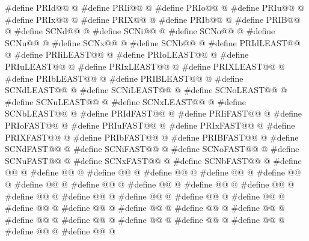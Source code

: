 \begin{codeblock}
#define PRId@@ @\seebelow@
#define PRIi@@ @\seebelow@
#define PRIo@@ @\seebelow@
#define PRIu@@ @\seebelow@
#define PRIx@@ @\seebelow@
#define PRIX@@ @\seebelow@
#define PRIb@@ @\seebelow@
#define PRIB@@ @\seebelow@
#define SCNd@@ @\seebelow@
#define SCNi@@ @\seebelow@
#define SCNo@@ @\seebelow@
#define SCNu@@ @\seebelow@
#define SCNx@@ @\seebelow@
#define SCNb@@ @\seebelow@
#define PRIdLEAST@@ @\seebelow@
#define PRIiLEAST@@ @\seebelow@
#define PRIoLEAST@@ @\seebelow@
#define PRIuLEAST@@ @\seebelow@
#define PRIxLEAST@@ @\seebelow@
#define PRIXLEAST@@ @\seebelow@
#define PRIbLEAST@@ @\seebelow@
#define PRIBLEAST@@ @\seebelow@
#define SCNdLEAST@@ @\seebelow@
#define SCNiLEAST@@ @\seebelow@
#define SCNoLEAST@@ @\seebelow@
#define SCNuLEAST@@ @\seebelow@
#define SCNxLEAST@@ @\seebelow@
#define SCNbLEAST@@ @\seebelow@
#define PRIdFAST@@ @\seebelow@
#define PRIiFAST@@ @\seebelow@
#define PRIoFAST@@ @\seebelow@
#define PRIuFAST@@ @\seebelow@
#define PRIxFAST@@ @\seebelow@
#define PRIXFAST@@ @\seebelow@
#define PRIbFAST@@ @\seebelow@
#define PRIBFAST@@ @\seebelow@
#define SCNdFAST@@ @\seebelow@
#define SCNiFAST@@ @\seebelow@
#define SCNoFAST@@ @\seebelow@
#define SCNuFAST@@ @\seebelow@
#define SCNxFAST@@ @\seebelow@
#define SCNbFAST@@ @\seebelow@
#define @@ @\seebelow@
#define @@ @\seebelow@
#define @@ @\seebelow@
#define @@ @\seebelow@
#define @@ @\seebelow@
#define @@ @\seebelow@
#define @@ @\seebelow@
#define @@ @\seebelow@
#define @@ @\seebelow@
#define @@ @\seebelow@
#define @@ @\seebelow@
#define @@ @\seebelow@
#define @@ @\seebelow@
#define @@ @\seebelow@
#define @@ @\seebelow@
#define @@ @\seebelow@
#define @@ @\seebelow@
#define @@ @\seebelow@
#define @@ @\seebelow@
#define @@ @\seebelow@
#define @@ @\seebelow@
#define @@ @\seebelow@
#define @@ @\seebelow@
#define @@ @\seebelow@
#define @@ @\seebelow@
#define @@ @\seebelow@
#define @@ @\seebelow@
#define @@ @\seebelow@
\end{codeblock}

